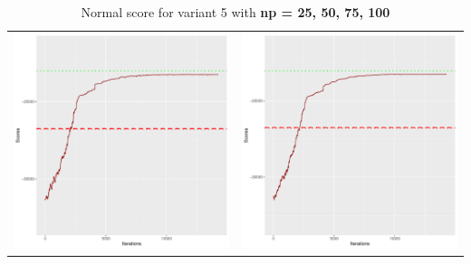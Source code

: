\documentclass[]{scrartcl}
\begin{document}
\begin{table}[h!]
\begin{tabular}{cc}
\includegraphics[scale = 0.4]{./figs/win95pts/v5/75/boundsEvolution-14252.pdf} & 
\includegraphics[scale = 0.4]{./figs/win95pts/v5/100/boundsEvolution-14252.pdf} \\
\end{tabular}
\caption{Normal score for variant 5 with \textbf{np =  25, 50, 75, 100 }}
\end{table}
\end{document}
